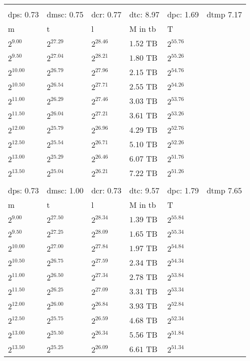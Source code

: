 \begin{tabular}{llllll}
 &  &  &  &  &  \\
dps: 0.73 & dmsc: 0.75 & dcr: 0.77 & dtc: 8.97 & dpc: 1.69 & dtmp 7.17 \\
m & t & l & M in tb & T \\
$2^{9.00}$ & $2^{27.29}$ & $2^{28.46}$ & $1.52$ TB & $2^{55.76}$ \\
$2^{9.50}$ & $2^{27.04}$ & $2^{28.21}$ & $1.80$ TB & $2^{55.26}$ \\
$2^{10.00}$ & $2^{26.79}$ & $2^{27.96}$ & $2.15$ TB & $2^{54.76}$ \\
$2^{10.50}$ & $2^{26.54}$ & $2^{27.71}$ & $2.55$ TB & $2^{54.26}$ \\
$2^{11.00}$ & $2^{26.29}$ & $2^{27.46}$ & $3.03$ TB & $2^{53.76}$ \\
$2^{11.50}$ & $2^{26.04}$ & $2^{27.21}$ & $3.61$ TB & $2^{53.26}$ \\
$2^{12.00}$ & $2^{25.79}$ & $2^{26.96}$ & $4.29$ TB & $2^{52.76}$ \\
$2^{12.50}$ & $2^{25.54}$ & $2^{26.71}$ & $5.10$ TB & $2^{52.26}$ \\
$2^{13.00}$ & $2^{25.29}$ & $2^{26.46}$ & $6.07$ TB & $2^{51.76}$ \\
$2^{13.50}$ & $2^{25.04}$ & $2^{26.21}$ & $7.22$ TB & $2^{51.26}$ \\
 &  &  &  &  &  \\
dps: 0.73 & dmsc: 1.00 & dcr: 0.73 & dtc: 9.57 & dpc: 1.79 & dtmp 7.65 \\
m & t & l & M in tb & T \\
$2^{9.00}$ & $2^{27.50}$ & $2^{28.34}$ & $1.39$ TB & $2^{55.84}$ \\
$2^{9.50}$ & $2^{27.25}$ & $2^{28.09}$ & $1.65$ TB & $2^{55.34}$ \\
$2^{10.00}$ & $2^{27.00}$ & $2^{27.84}$ & $1.97$ TB & $2^{54.84}$ \\
$2^{10.50}$ & $2^{26.75}$ & $2^{27.59}$ & $2.34$ TB & $2^{54.34}$ \\
$2^{11.00}$ & $2^{26.50}$ & $2^{27.34}$ & $2.78$ TB & $2^{53.84}$ \\
$2^{11.50}$ & $2^{26.25}$ & $2^{27.09}$ & $3.31$ TB & $2^{53.34}$ \\
$2^{12.00}$ & $2^{26.00}$ & $2^{26.84}$ & $3.93$ TB & $2^{52.84}$ \\
$2^{12.50}$ & $2^{25.75}$ & $2^{26.59}$ & $4.68$ TB & $2^{52.34}$ \\
$2^{13.00}$ & $2^{25.50}$ & $2^{26.34}$ & $5.56$ TB & $2^{51.84}$ \\
$2^{13.50}$ & $2^{25.25}$ & $2^{26.09}$ & $6.61$ TB & $2^{51.34}$ \\

\end{tabular}
